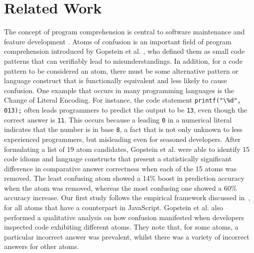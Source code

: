 
\section{Related Work}

\label{back}

The concept of program comprehension is central to software maintenance and feature development \cite{DBLP:conf/iwpc/TilleySP96, DBLP:journals/ibmsj/OHareT94}. Atoms of confusion is an important field of program comprehension introduced by Gopstein et al. \cite{DBLP:conf/msr/GopsteinZFC18}, who defined them as small code patterns that can verifiably lead to misunderstandings. In addition, for a code pattern to be considered an atom, there must be some alternative pattern or language construct that is functionally equivalent and less likely to cause confusion. One example that occurs in many programming languages is the Change of Literal Encoding. For instance, the \clang code statement \lstinline{printf("\%d", 013);} 
often leads programmers to predict the output to be \texttt{13}, even though the correct answer is \texttt{11}. This occurs because a leading \texttt{0} in a numerical literal indicates that the number is in base \texttt{8}, a fact that is not only unknown to less experienced programmers, but misleading even for seasoned developers. After formulating a list of 19 atom candidates, Gopstein et al. \cite{DBLP:conf/sigsoft/GopsteinIYDZYC17} were able to identify 15 code idioms and language constructs that present a statistically significant difference in comparative answer correctness when each of the 15 atoms was removed. The least confusing atom showed a 14\% boost in prediction accuracy when the atom was removed, whereas the most confusing one showed a 60\% accuracy increase. Our first study follows the empirical framework discussed in~\cite{DBLP:conf/sigsoft/GopsteinIYDZYC17}, for all atoms that have a counterpart in JavaScript. Gopstein et al. \cite{DBLP:conf/msr/GopsteinZFC18} also performed a qualitative analysis on how confusion manifested when developers inspected code exhibiting different atoms.
They note that, for some atoms, a particular incorrect answer was prevalent, whilst there was a variety of incorrect answers for other atoms.

